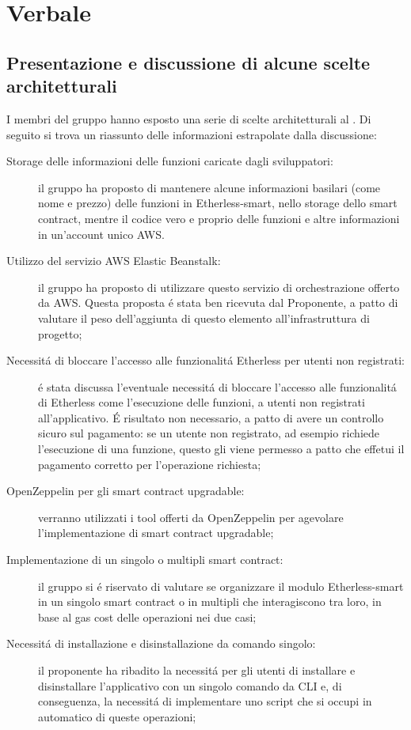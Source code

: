 \section{Verbale}
\subsection{Presentazione e discussione di alcune scelte architetturali}
I membri del gruppo hanno esposto una serie di scelte architetturali al \Proponente.
Di seguito si trova un riassunto delle informazioni estrapolate dalla discussione:
\begin{description}
	\item [Storage delle informazioni delle funzioni caricate dagli sviluppatori:] il gruppo ha proposto di mantenere alcune informazioni basilari (come nome e prezzo) delle funzioni in Etherless-smart, nello storage dello smart contract, mentre il codice vero e proprio delle funzioni e altre informazioni in un'account unico AWS.
	\item [Utilizzo del servizio AWS Elastic Beanstalk:] il gruppo ha proposto di utilizzare questo servizio di orchestrazione offerto da AWS. Questa proposta é stata ben ricevuta dal Proponente, a patto di valutare il peso dell'aggiunta di questo elemento all'infrastruttura di progetto;
	\item [Necessitá di bloccare l'accesso alle funzionalitá Etherless per utenti non registrati:] é stata discussa l'eventuale necessitá di bloccare l'accesso alle funzionalitá di Etherless come l'esecuzione delle funzioni, a utenti non registrati all'applicativo. É risultato non necessario, a patto di avere un controllo sicuro sul pagamento: se un utente non registrato, ad esempio richiede l'esecuzione di una funzione, questo gli viene permesso a patto che effetui il pagamento corretto per l'operazione richiesta;
	\item [OpenZeppelin per gli smart contract upgradable:] verranno utilizzati i tool offerti da OpenZeppelin per agevolare l'implementazione di smart contract upgradable;
	\item [Implementazione di un singolo o multipli smart contract:] il gruppo si é riservato di valutare se organizzare il modulo Etherless-smart in un singolo smart contract o in multipli che interagiscono tra loro, in base al gas cost delle operazioni nei due casi;
	\item [Necessitá di installazione e disinstallazione da comando singolo:] il proponente ha ribadito la necessitá per gli utenti di installare e disinstallare l'applicativo con un singolo comando da CLI e, di conseguenza, la necessitá di implementare uno script che si occupi in automatico di queste operazioni;
\end{description}
